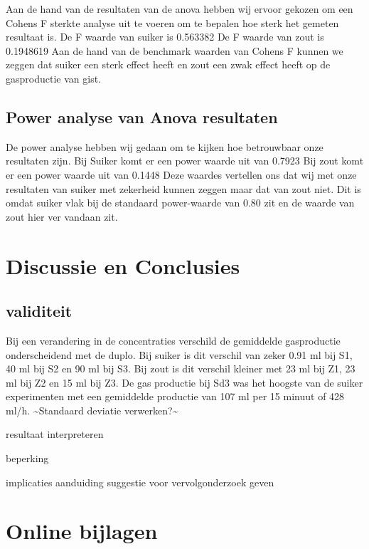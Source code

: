 \documentclass[
]{article}
\begin{document}
Aan de hand van de resultaten van de anova hebben wij ervoor gekozen om een Cohens F sterkte analyse uit te voeren om te bepalen hoe sterk het gemeten resultaat is.
De F waarde van suiker is 0.563382
De F waarde van zout is 0.1948619
Aan de hand van de benchmark waarden van Cohens F kunnen we zeggen dat suiker een sterk effect heeft en zout een zwak effect heeft op de gasproductie van gist.

\subsection{Power analyse van Anova resultaten}\label{power-analyse-van-anova-resultaten}

De power analyse hebben wij gedaan om te kijken hoe betrouwbaar onze resultaten zijn.
Bij Suiker komt er een power waarde uit van 0.7923
Bij zout komt er een power waarde uit van 0.1448
Deze waardes vertellen ons dat wij met onze resultaten van suiker met zekerheid kunnen zeggen maar dat van zout niet. Dit is omdat suiker vlak bij de standaard power-waarde van 0.80 zit en de waarde van zout hier ver vandaan zit.

\section{Discussie en Conclusies}\label{discussie-en-conclusies}

\subsection{validiteit}\label{validiteit}

Bij een verandering in de concentraties verschild de gemiddelde gasproductie onderscheidend met de duplo. Bij suiker is dit verschil van zeker 0.91 ml bij S1, 40 ml bij S2 en 90 ml bij S3. Bij zout is dit verschil kleiner met 23 ml bij Z1, 23 ml bij Z2 en 15 ml bij Z3. De gas productie bij Sd3 was het hoogste van de suiker experimenten met een gemiddelde productie van 107 ml per 15 minuut of 428 ml/h.
\textasciitilde Standaard deviatie verwerken?\textasciitilde{}

resultaat interpreteren

beperking

implicaties aanduiding
suggestie voor vervolgonderzoek geven

\section{Online bijlagen}\label{online-bijlagen}
\end{document}
